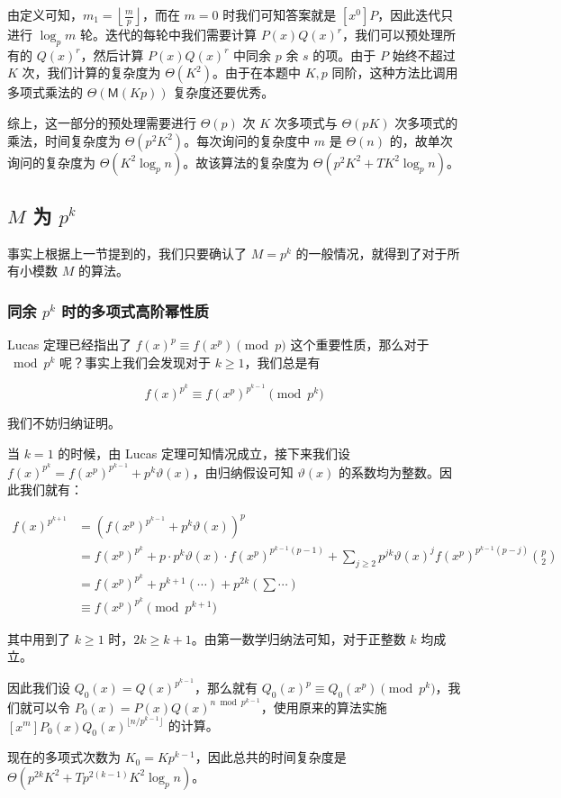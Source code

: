 \documentclass[12pt]{ctexart}
\newcommand{\Mul}{\ensuremath{\mathsf M}}
\begin{document}
由定义可知，$m_1 = \left\lfloor\frac mp\right\rfloor$，而在 $m=0$ 时我们可知答案就是 $[x^0]P$，因此迭代只进行 $\log_p m$ 轮。迭代的每轮中我们需要计算 $P(x)Q(x)^r$，我们可以预处理所有的 $Q(x)^r$，然后计算 $P(x)Q(x)^r$ 中同余 $p$ 余 $s$ 的项。由于 $P$ 始终不超过 $K$ 次，我们计算的复杂度为 $\Theta(K^2)$。由于在本题中 $K,p$ 同阶，这种方法比调用多项式乘法的 $\Theta(\Mul(Kp))$ 复杂度还要优秀。

综上，这一部分的预处理需要进行 $\Theta(p)$ 次 $K$ 次多项式与 $\Theta(pK)$ 次多项式的乘法，时间复杂度为 $\Theta(p^2K^2)$。每次询问的复杂度中 $m$ 是 $\Theta(n)$ 的，故单次询问的复杂度为 $\Theta(K^2\log_p n)$。故该算法的复杂度为 $\Theta(p^2K^2 + TK^2\log_p n)$。

\subsection{$M$ 为 $p^k$}

事实上根据上一节提到的，我们只要确认了 $M=p^k$ 的一般情况，就得到了对于所有小模数 $M$ 的算法。

\subsubsection{同余 $p^k$ 时的多项式高阶幂性质}

Lucas 定理已经指出了 $f(x)^p\equiv f(x^p) \pmod p$ 这个重要性质，那么对于 $\bmod p^k$ 呢？事实上我们会发现对于 $k\ge 1$，我们总是有

$$
f(x)^{p^k} \equiv f(x^p)^{p^{k-1}} \pmod {p^k}
$$

我们不妨归纳证明。

当 $k=1$ 的时候，由 Lucas 定理可知情况成立，接下来我们设 $f(x)^{p^k} = f(x^p)^{p^{k-1}} + p^k \vartheta(x)$，由归纳假设可知 $\vartheta(x)$ 的系数均为整数。因此我们就有：

\begin{align*}
f(x)^{p^{k+1}} &= \left(f(x^p)^{p^{k-1}} + p^k \vartheta(x)\right)^p\\
 &= f(x^p)^{p^k} + p \cdot p^k \vartheta(x) \cdot f(x^p)^{p^{k-1}(p-1)} + \sum_{j\ge 2}  p^{jk} \vartheta(x)^j f(x^p)^{p^{k-1}(p-j)}\binom p 2 \\
 &= f(x^p)^{p^k} + p^{k+1} (\cdots) + p^{2k}\left(\sum \cdots\right)\\
 &\equiv f(x^p)^{p^k} \pmod {p^{k+1}}
\end{align*}

其中用到了 $k\ge 1$ 时，$2k\ge k+1$。由第一数学归纳法可知，对于正整数 $k$ 均成立。

因此我们设 $Q_0(x) = Q(x)^{p^{k-1}}$，那么就有 $Q_0(x)^p \equiv Q_0(x^p) \pmod {p^k}$，我们就可以令 $P_0(x)=P(x)Q(x)^{n\bmod p^{k-1}}$，使用原来的算法实施 $[x^m]P_0(x)Q_0(x)^{\lfloor n/p^{k-1} \rfloor}$ 的计算。

现在的多项式次数为 $K_0 = Kp^{k-1}$，因此总共的时间复杂度是 $\Theta(p^{2k}K^2 + Tp^{2(k-1)}K^2 \log_p n)$。
\end{document}
